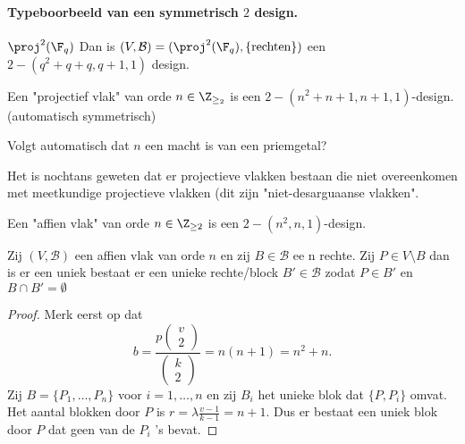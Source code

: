 \paragraph{Typeboorbeeld van een symmetrisch $2$ design.}
\begin{vb}
	$\proj^2(\F_q) $ Dan is $(V , \mathcal{B} ) = (\proj^2(\F_q), \{\text{rechten}\} )$ een $2-(q^2 + q + q, q + 1, 1)$ design.
\end{vb}
\begin{definitie}
	Een "projectief vlak" van orde $n \in \Z_{\ge_2}$ is een $2-(n^2 + n + 1, n + 1, 1)$-design. (automatisch symmetrisch)
\end{definitie}
\begin{conjectuur}
	Volgt automatisch dat $n$ een macht is van een priemgetal?	
\end{conjectuur}
\begin{opmerking}
	Het is nochtans geweten dat er projectieve vlakken bestaan die niet overeenkomen met meetkundige projectieve vlakken (dit zijn "niet-desarguaanse vlakken".
\end{opmerking}
\begin{definitie}
	Een "affien vlak" van orde $n \in \Z_{\ge 2}$ is een $2-(n^2, n , 1)$-design.
\end{definitie}
\begin{eigenschap}
	Zij $(V, \mathcal{B} )$ een affien vlak van orde $n$ en zij $ B \in \mathcal{B} $ ee n rechte. 
	Zij $P \in V \setminus B$ dan is er een uniek bestaat er een unieke rechte/block $B' \in \mathcal{B} $ zodat $P \in B'$ en $B \cap B' = \emptyset$
\end{eigenschap}
\begin{proof}
	Merk eerst op dat \[
		b = \frac{p\begin{pmatrix}  v \\ 2 \end{pmatrix} }{\begin{pmatrix} k \\ 2 \end{pmatrix} } = n(n+1) = n^2 + n
	.\] 
	Zij $B = \{P_1, \ldots, P_n\} $ voor $ i = 1, \ldots, n$ en zij $B_i$ het unieke blok dat $\{P, P_i\} $ omvat.
	Het aantal blokken door $P$ is $r = \lambda \frac{v - 1}{k -1} = n +1$.
	Dus er bestaat een uniek blok door $ P$ dat geen van de $P_i$ 's bevat.
\end{proof}


